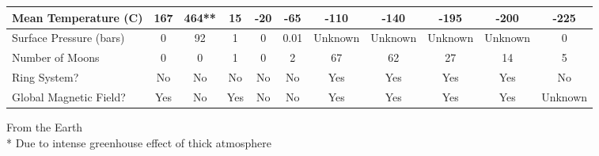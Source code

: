\documentclass[12pt]{article}
\begin{document}
\begin{center}
{\begin{tabular}{|p{2.5cm}|*{10}{c|}}
  Mean Temperature (C) &  167 &  464** &  15 &  -20 &  -65 &  -110 &  -140 &  -195 &  -200 &  -225 \\ \hline
  Surface Pressure (bars) &  0 &  92 &  1 &  0 &  0.01 &  Unknown &  Unknown &  Unknown &  Unknown &  0 \\ \hline
  Number of Moons &  0 &  0 &  1 &  0 &  2 &  67 &  62 &  27 &  14 &  5 \\ \hline
  Ring System? &  No &  No &  No &  No &  No &  Yes &  Yes &  Yes &  Yes &  No \\ \hline
  Global Magnetic Field? &  Yes &  No &  Yes &  No &  No &  Yes &  Yes &  Yes &  Yes &  Unknown \\ \hline
\end{tabular}
}
\end{center}
{\footnotesize * From the Earth}\\
{\footnotesize ** Due to intense greenhouse effect of thick atmosphere}\\
\end{document}
